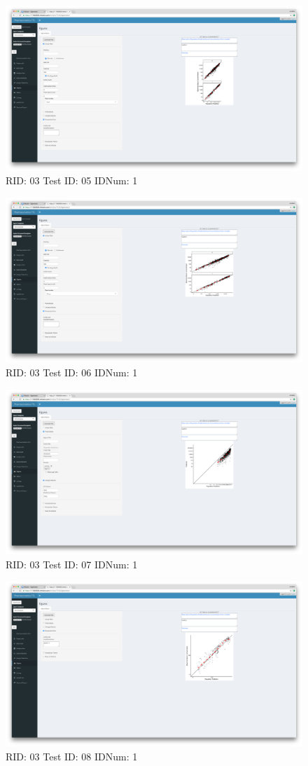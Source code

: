 \begin{figure}[H]
\includegraphics[width=.8\textwidth]{screencaps/03-05-1.png}
\caption{RID: 03 Test ID: 05 IDNum: 1}
\end{figure}
\begin{figure}[H]
\includegraphics[width=.8\textwidth]{screencaps/03-06-1.png}
\caption{RID: 03 Test ID: 06 IDNum: 1}
\end{figure}
\begin{figure}[H]
\includegraphics[width=.8\textwidth]{screencaps/03-07-1.png}
\caption{RID: 03 Test ID: 07 IDNum: 1}
\end{figure}
\begin{figure}[H]
\includegraphics[width=.8\textwidth]{screencaps/03-08-1.png}
\caption{RID: 03 Test ID: 08 IDNum: 1}
\end{figure}
